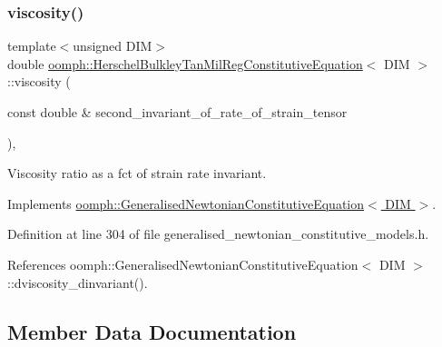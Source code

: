 \subsubsection{\texorpdfstring{viscosity()}{viscosity()}}
{\footnotesize\ttfamily template$<$unsigned D\+IM$>$ \\
double \hyperlink{classoomph_1_1HerschelBulkleyTanMilRegConstitutiveEquation}{oomph\+::\+Herschel\+Bulkley\+Tan\+Mil\+Reg\+Constitutive\+Equation}$<$ D\+IM $>$\+::viscosity (\begin{DoxyParamCaption}\item[{const double \&}]{second\+\_\+invariant\+\_\+of\+\_\+rate\+\_\+of\+\_\+strain\+\_\+tensor }\end{DoxyParamCaption})\hspace{0.3cm}{\ttfamily [inline]}, {\ttfamily [virtual]}}



Viscosity ratio as a fct of strain rate invariant. 



Implements \hyperlink{classoomph_1_1GeneralisedNewtonianConstitutiveEquation_a3e6d811786e39ca3c3a9b1c46249442f}{oomph\+::\+Generalised\+Newtonian\+Constitutive\+Equation$<$ D\+I\+M $>$}.



Definition at line 304 of file generalised\+\_\+newtonian\+\_\+constitutive\+\_\+models.\+h.



References oomph\+::\+Generalised\+Newtonian\+Constitutive\+Equation$<$ D\+I\+M $>$\+::dviscosity\+\_\+dinvariant().



\subsection{Member Data Documentation}
\mbox{\label{classoomph_1_1HerschelBulkleyTanMilRegConstitutiveEquation_ad77e04bccbd2e7eb24fc8965e68007b9}} 
